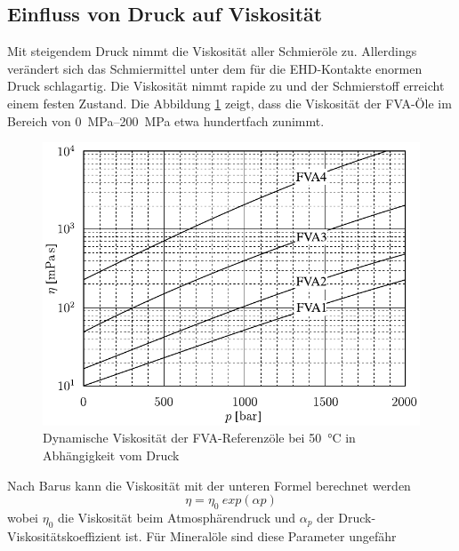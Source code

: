 \subsection*{Einfluss von Druck auf Viskosität}
\label{sub:einfluss_von_druck_auf_viskositaet}
Mit steigendem Druck nimmt die Viskosität aller Schmieröle zu.
Allerdings verändert sich das Schmiermittel unter dem für die EHD-Kontakte enormen Druck schlagartig.
Die Viskosität nimmt rapide zu und der Schmierstoff erreicht einem festen Zustand.
Die Abbildung \ref{fig:dynamische_viskositaet_in_abhaengigkeit_vom_druck} zeigt, dass die Viskosität der FVA-Öle im Bereich von \SIrange{0}{200}{\mega\pascal} etwa hundertfach zunimmt.
\begin{figure}[htb]
    \centering
    \includegraphics[]{./images/viskositaet_druck.pdf}
    \caption{Dynamische Viskosität der FVA-Referenzöle bei \SI{50}{\degreeCelsius} in Abhängigkeit vom Druck \cite{schilling_1985}}
    \label{fig:dynamische_viskositaet_in_abhaengigkeit_vom_druck}
\end{figure}
%

Nach Barus kann die Viskosität mit der unteren Formel berechnet werden
\begin{equation}
    \eta = \eta_0 \ exp(\alpha p)
    \label{eq:dynamische_viskositaet_druck_barus}
\end{equation}
%
wobei $\eta_0$ die Viskosität beim Atmosphärendruck und $\alpha_p$ der Druck-Viskositätskoeffizient  ist.
Für Mineralöle sind diese Parameter ungefähr

